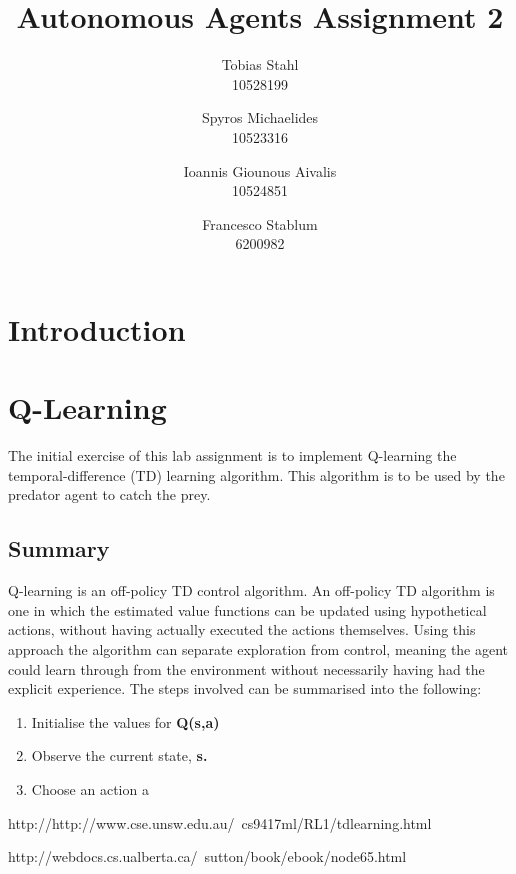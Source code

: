 \documentclass[11pt]{article}
\title{
	\textbf{Autonomous Agents Assignment 2}
}
\author{Tobias Stahl \\ 10528199 \and Spyros Michaelides \\ 10523316 \and Ioannis Giounous Aivalis \\ 10524851 \and Francesco Stablum \\ 6200982}
\begin{document}
\maketitle




\section{Introduction}



\section{Q-Learning}
The initial exercise of this lab assignment is to implement Q-learning the temporal-difference (TD) learning algorithm. This algorithm is to be used by the predator agent to catch the prey.



\subsection{Summary}
Q-learning is an off-policy TD control algorithm. An off-policy TD algorithm is one in which the estimated value functions can be updated using hypothetical actions, without having actually executed the actions themselves. Using this approach the algorithm can separate exploration from control, meaning the agent could learn through from the environment without necessarily having had the explicit experience.
The steps involved can be summarised into the following:\\
\begin{enumerate}
	\item Initialise the values for \bf{Q(s,a)}
	\item Observe the current state, \bf{s}.
	\item Choose an action a
\end{enumerate}



\begin{thebibliography}{2}

 http://http://www.cse.unsw.edu.au/~cs9417ml/RL1/tdlearning.html

 http://webdocs.cs.ualberta.ca/~sutton/book/ebook/node65.html


\end{thebibliography}
\end{document}
